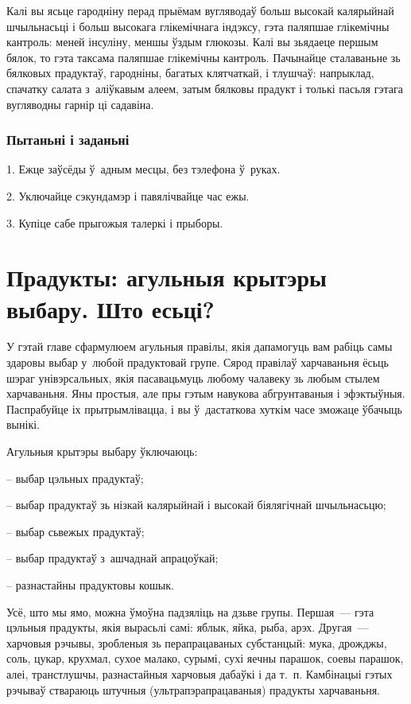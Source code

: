 Калі вы ясьце гародніну перад прыёмам вугляводаў больш высокай калярыйнай шчыльнасьці і больш высокага глікемічнага індэксу, гэта паляпшае глікемічны кантроль: меней інсуліну, меншы ўздым глюкозы. Калі вы зьядаеце першым бялок, то гэта таксама паляпшае глікемічны кантроль. Пачынайце сталаваньне зь бялковых прадуктаў, гародніны, багатых клятчаткай, і тлушчаў: напрыклад, спачатку салата з~аліўкавым алеем, затым бялковы прадукт і толькі пасьля гэтага вугляводны гарнір ці садавіна.

\subsubsection{Пытаньні і заданьні}

1. Ежце заўсёды ў~адным месцы, без тэлефона ў~руках.

2. Уключайце сэкундамэр і павялічвайце час ежы.

3. Купіце сабе прыгожыя талеркі і прыборы.


\section{Прадукты: агульныя крытэры выбару. Што есьці?}

У гэтай главе сфармулюем агульныя правілы, якія дапамогуць вам рабіць самы здаровы выбар у~любой прадуктовай групе. Сярод правілаў харчаваньня ёсьць шэраг унівэрсальных, якія пасавацьмуць любому чалавеку зь любым стылем харчаваньня. Яны простыя, але пры гэтым навукова абгрунтаваныя і эфэктыўныя. Паспрабуйце іх прытрымлівацца, і вы ў~дастаткова хуткім часе зможаце ўбачыць вынікі.

Агульныя крытэры выбару ўключаюць: 

– выбар цэльных прадуктаў;

– выбар прадуктаў зь нізкай калярыйнай і высокай біялягічнай шчыльнасьцю;

– выбар сьвежых прадуктаў;

– выбар прадуктаў з~ашчаднай апрацоўкай;

– разнастайны прадуктовы кошык.

Усё, што мы ямо, можна ўмоўна падзяліць на дзьве групы. Першая~--- гэта цэльныя прадукты, якія вырасьлі самі: яблык, яйка, рыба, арэх. Другая~--- харчовыя рэчывы, зробленыя зь перапрацаваных субстанцый: мука, дрожджы, соль, цукар, крухмал, сухое малако, сурымі, сухі яечны парашок, соевы парашок, алеі, транстлушчы, разнастайныя харчовыя дабаўкі і да т.~п. Камбінацыі гэтых рэчываў ствараюць штучныя (ультрапэрапрацаваныя) прадукты харчаваньня.

